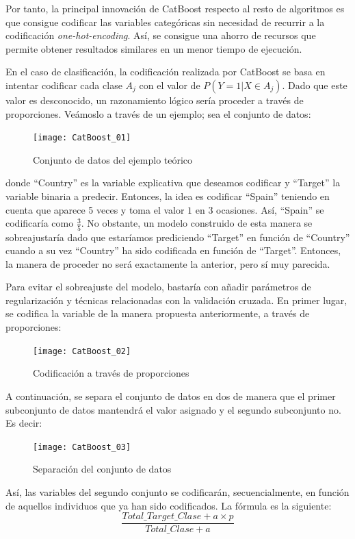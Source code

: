 \documentclass[12pt,twoside]{article}
\begin{document}
Por tanto, la principal innovación de CatBoost respecto al resto de algoritmos es que consigue codificar las variables categóricas sin necesidad de recurrir a la codificación \textit{one-hot-encoding}. Así, se consigue una ahorro de recursos que permite obtener resultados similares en un menor tiempo de ejecución.

En el caso de clasificación, la codificación realizada por CatBoost se basa en intentar codificar cada clase $A_j$ con el valor de $P(Y = 1 | X \in A_j)$. Dado que este valor es desconocido, un razonamiento lógico sería proceder a través de proporciones.  Veámoslo a través de un ejemplo; sea el conjunto de datos:
\begin{figure}[h]
\centering
\texttt{[image: CatBoost\_01]}
\caption{Conjunto de datos del ejemplo teórico}
\end{figure}

\noindent
donde ``Country'' es la variable explicativa que deseamos codificar y ``Target'' la variable binaria a predecir. Entonces, la idea es codificar ``Spain'' teniendo en cuenta que aparece 5 veces y toma el valor $1$ en 3 ocasiones. Así, ``Spain'' se codificaría como $\frac{3}{5}$. No obstante, un modelo construido de esta manera se sobreajustaría dado que estaríamos prediciendo ``Target'' en función de ``Country'' cuando a su vez ``Country'' ha sido codificada en función de ``Target''. Entonces, la manera de proceder no será exactamente la anterior, pero sí muy parecida.

Para evitar el sobreajuste del modelo, bastaría con añadir parámetros de regularización y técnicas relacionadas con la validación cruzada. En primer lugar, se codifica la variable de la manera propuesta anteriormente, a través de proporciones:
\begin{figure}[H]
\centering
\texttt{[image: CatBoost\_02]}
\caption{Codificación a través de proporciones}
\end{figure}

A continuación, se separa el conjunto de datos en dos de manera que el primer subconjunto de datos mantendrá el valor asignado y el segundo subconjunto no. Es decir:
\begin{figure}[h]
\centering
\texttt{[image: CatBoost\_03]}
\caption{Separación del conjunto de datos}
\end{figure}

Así, las variables del segundo conjunto se codificarán, secuencialmente, en función de aquellos individuos que ya han sido codificados. La fórmula es la siguiente:
\begin{equation*}
\frac{Total\_Target\_Clase + a\times p}{Total\_Clase + a}
\end{equation*}
\end{document}
